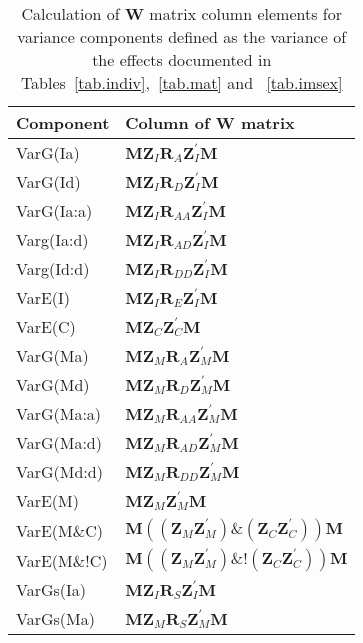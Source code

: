 \begin{table}
\centering
\caption{Calculation of ${\bm W}$ matrix column elements for variance components defined as the variance of the effects documented in Tables~\ref{tab.indiv},~\ref{tab.mat} and ~\ref{tab.imsex}}
\label{tab.wcol}
\vspace{0.1in}
\begin{tabular}{l|l}
Component & Column of ${\bm W}$ matrix \\ \hline
VarG(Ia)      &  ${\bm M \bm Z_{I} \bm R_{A} \bm Z_{I}^{\prime} \bm M }$    \\
VarG(Id)      &  ${\bm M \bm Z_{I} \bm R_{D} \bm Z_{I}^{\prime} \bm M }$   \\
VarG(Ia:a)    &  ${\bm M \bm Z_{I} \bm R_{AA} \bm Z_{I}^{\prime} \bm M }$   \\
Varg(Ia:d)    &  ${\bm M \bm Z_{I} \bm R_{AD} \bm Z_{I}^{\prime} \bm M }$  \\
Varg(Id:d)    &  ${\bm M \bm Z_{I} \bm R_{DD} \bm Z_{I}^{\prime} \bm M }$  \\
VarE(I)       &  ${\bm M \bm Z_{I} \bm R_{E} \bm Z_{I}^{\prime} \bm M }$  \\
VarE(C)       &  ${\bm M \bm Z_{C} \bm Z_{C}^{\prime} \bm M }$  \\    \hline
VarG(Ma)      &  ${\bm M \bm Z_{M} \bm R_{A} \bm Z_{M}^{\prime} \bm M }$  \\
VarG(Md)      &  ${\bm M \bm Z_{M} \bm R_{D} \bm Z_{M}^{\prime} \bm M }$  \\
VarG(Ma:a)    &  ${\bm M \bm Z_{M} \bm R_{AA} \bm Z_{M}^{\prime} \bm M }$  \\
VarG(Ma:d)    &  ${\bm M \bm Z_{M} \bm R_{AD} \bm Z_{M}^{\prime} \bm M }$  \\
VarG(Md:d)    &  ${\bm M \bm Z_{M} \bm R_{DD} \bm Z_{M}^{\prime} \bm M }$  \\
VarE(M)       &  ${\bm M \bm Z_{M}  \bm Z_{M}^{\prime} \bm M }$  \\
VarE(M\&C)    &  ${\bm M ((\bm Z_{M} \bm Z_{M}^{\prime}) \& (\bm Z_{C} \bm Z_{C}^{\prime})) \bm M }$  \\
VarE(M\&!C)   &  ${\bm M ((\bm Z_{M} \bm Z_{M}^{\prime}) \&! (\bm Z_{C} \bm Z_{C}^{\prime})) \bm M }$  \\  \hline
VarGs(Ia)     &  ${\bm M \bm Z_{I} \bm R_{S} \bm Z_{I}^{\prime} \bm M }$  \\
VarGs(Ma)     &  ${\bm M \bm Z_{M} \bm R_{S} \bm Z_{M}^{\prime} \bm M }$  \\ \hline
\end{tabular}
\end{table}
